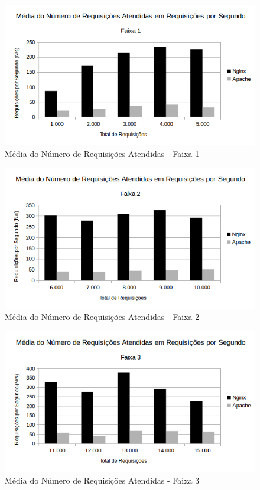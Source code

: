 \begin{figure}[H]
	\centering
	\includegraphics[width=1\linewidth]{graficos/grafico4-f1} 
	\caption{Média do Número de Requisições Atendidas - Faixa 1}
	\label{fig:grafico4-f1}
\end{figure}

\begin{figure}[H]
	\centering
	\includegraphics[width=1\linewidth]{graficos/grafico4-f2} 
	\caption{Média do Número de Requisições Atendidas - Faixa 2}
	\label{fig:grafico4-f2}
\end{figure}

\begin{figure}[H]
	\centering
	\includegraphics[width=1\linewidth]{graficos/grafico4-f3} 
	\caption{Média do Número de Requisições Atendidas - Faixa 3}
	\label{fig:grafico4-f3}
\end{figure}

